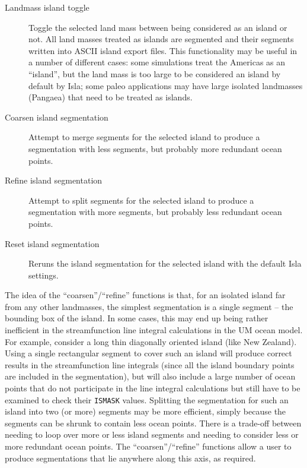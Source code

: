\documentclass[11pt,makeidx,texhelp]{report}
\begin{document}
\begin{description}
  \item[Landmass island toggle]{Toggle the selected land mass between
    being considered as an island or not.  All land masses treated as
    islands are segmented and their segments written into ASCII island
    export files.  This functionality may be useful in a number of
    different cases: some simulations treat the Americas as an
    ``island'', but the land mass is too large to be considered an
    island by default by Isla; some paleo applications may have large
    isolated landmasses (Pangaea) that need to be treated as islands.}
  \item[Coarsen island segmentation]{Attempt to merge segments for the
    selected island to produce a segmentation with less segments, but
    probably more redundant ocean points.}
  \item[Refine island segmentation]{Attempt to split segments for the
    selected island to produce a segmentation with more segments, but
    probably less redundant ocean points.}
  \item[Reset island segmentation]{Reruns the island segmentation for
    the selected island with the default Isla settings.}
\end{description}

The idea of the ``coarsen''/``refine'' functions is that, for an
isolated island far from any other landmasses, the simplest
segmentation is a single segment -- the bounding box of the island.
In some cases, this may end up being rather inefficient in the
streamfunction line integral calculations in the UM ocean model.  For
example, consider a long thin diagonally oriented island (like New
Zealand).  Using a single rectangular segment to cover such an island
will produce correct results in the streamfunction line integrals
(since all the island boundary points are included in the
segmentation), but will also include a large number of ocean points
that do not participate in the line integral calculations but still
have to be examined to check their \texttt{ISMASK} values.  Splitting
the segmentation for such an island into two (or more) segments may be
more efficient, simply because the segments can be shrunk to contain
less ocean points.  There is a trade-off between needing to loop over
more or less island segments and needing to consider less or more
redundant ocean points.  The ``coarsen''/``refine'' functions allow a
user to produce segmentations that lie anywhere along this axis, as
required.

\end{document}
